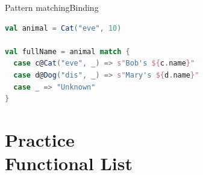 \documentclass[aspectratio=169]{beamer}
\begin{document}
\begin{frame}[fragile]{Pattern matching}{Binding}
\begin{lstlisting}[style=scala,language=scala]
val animal = Cat("eve", 10)

val fullName = animal match {
  case c@Cat("eve", _) => s"Bob's ${c.name}"
  case d@Dog("dis", _) => s"Mary's ${d.name}"
  case _ => "Unknown"
}
\end{lstlisting}
\end{frame}


\section{Practice \\ Functional List}


\end{document}
